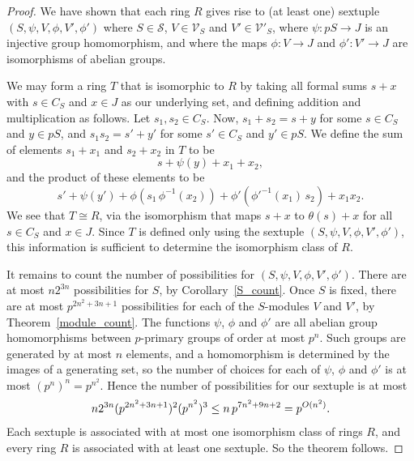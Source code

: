 \documentclass[12pt]{article}
\newcommand{\Oh}{\mathnormal{O}}
\begin{document}
\begin{proof}
We have shown that each ring $R$ gives rise to (at least one) sextuple $(S,\psi,V,\phi,V',\phi')$ where $S\in \mathcal{S}$, $V\in \mathcal{V}_S$ and $V'\in\mathcal{V}'_S$, where $\psi:pS\rightarrow J$ is an injective group homomorphism, and where the maps $\phi:V\rightarrow J$ and $\phi':V'\rightarrow J$ are isomorphisms of abelian groups.

We may form a ring $T$ that is isomorphic to $R$ by taking all formal sums $s+x$ with $s\in C_S$ and $x\in J$ as our underlying set, and defining addition and multiplication as follows. Let $s_1,s_2\in C_S$. Now, $s_1+s_2=s+y$ for some $s\in C_S$ and $y\in pS$, and $s_1s_2=s'+y'$ for some $s'\in C_S$ and $y'\in pS$. We define the sum of elements $s_1+x_1$ and $s_2+x_2$ in $T$ to be
\[
s+\psi(y)+x_1+x_2,
\]
and the product of these elements to be
\[
s'+\psi(y')+\phi(s_1\,\phi^{-1}(x_2))+\phi'(\phi'^{-1}(x_1)\, s_2)+x_1x_2.
\]
We see that $T\cong R$, via the isomorphism that maps $s+x$ to $\theta(s)+x$ for all $s\in C_S$ and $x\in J$. Since $T$ is defined only using the sextuple $(S,\psi,V,\phi,V',\phi')$, this information is sufficient to determine the isomorphism class of $R$.

It remains to count the number of possibilities for $(S,\psi,V,\phi,V',\phi')$. There are at most $n2^{3n}$ possibilities for $S$, by Corollary~\ref{S_count}. Once $S$ is fixed, there are at most $p^{2n^2+3n+1}$ possibilities for each of the $S$-modules $V$ and $V'$, by Theorem~\ref{module_count}. The functions $\psi$, $\phi$ and $\phi'$ are all abelian group homomorphisms between $p$-primary groups of order at most $p^n$. Such groups are generated by at most $n$ elements, and a homomorphism is determined by the images of a generating set, so the number of choices for each of $\psi$, $\phi$ and $\phi'$ is at most $(p^n)^n=p^{n^2}$. Hence the number of possibilities for our sextuple is at most 
\[
n2^{3n}(p^{2n^2+3n+1})^2(p^{n^2})^3\leq n\, p^{7n^2+9n+2}=p^{\Oh(n^2)}.
\]
Each sextuple is associated with at most one isomorphism class of rings $R$, and every ring $R$ is associated with at least one sextuple. So the theorem follows.
\end{proof}
\end{document}
